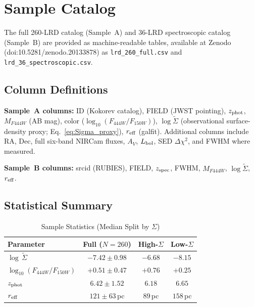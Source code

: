 \documentclass[apj,twocolumn,longbibliography,linenumbers]{aastex701}
\begin{document}


\appendix

\section{Sample Catalog}

The full 260-LRD catalog (Sample~A) and 36-LRD spectroscopic catalog (Sample~B) are provided as machine-readable tables, available at Zenodo (doi:10.5281/zenodo.20133878) as \texttt{lrd\_260\_full.csv} and \texttt{lrd\_36\_spectroscopic.csv}.

\subsection{Column Definitions}

\textbf{Sample~A columns:} ID (Kokorev catalog), FIELD (JWST pointing), $z_{\rm phot}$, $M_{F444W}$ (AB mag), color ($\log_{10}(F_{444W}/F_{150W})$), $\log\tilde\Sigma$ (observational surface-density proxy; Eq.~\ref{eq:Sigma_proxy}), $r_{\rm eff}$ (galfit). Additional columns include RA, Dec, full six-band NIRCam fluxes, $A_V$, $L_{\rm bol}$, SED $\Delta\chi^2$, and FWHM where measured.

\textbf{Sample~B columns:} srcid (RUBIES), FIELD, $z_{\rm spec}$, FWHM, $M_{F444W}$, $\log\tilde\Sigma$, $r_{\rm eff}$.

\subsection{Statistical Summary}

\begin{table}[h]
\caption{Sample Statistics (Median Split by $\Sigma$)}
\label{tab:median_split}
\centering
\footnotesize
\begin{tabular}{lccc}
\hline
Parameter & Full ($N = 260$) & High-$\Sigma$ & Low-$\Sigma$ \\
\hline
$\log\,\tilde\Sigma$ & $-7.42 \pm 0.98$ & $-6.68$ & $-8.15$ \\
$\log_{10}(F_{444W}/F_{150W})$ & $+0.51 \pm 0.47$ & $+0.76$ & $+0.25$ \\
$z_{\rm phot}$ & $6.42 \pm 1.52$ & $6.18$ & $6.65$ \\
$r_{\rm eff}$ & $121 \pm 63$\,pc & $89$\,pc & $158$\,pc \\
\hline
\end{tabular}
\end{table}
\end{document}
